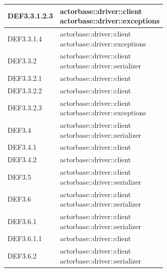\documentclass{scalatekids-article}
\begin{document}
\begin{longtable}[H]{|p{3.5cm}|p{7.5cm}|}
\hline
DEF3.3.1.2.3 & \multiLineCell[t]{actorbase::driver::client\\actorbase::driver::exceptions\\}\\
\hline
DEF3.3.1.4 & \multiLineCell[t]{actorbase::driver::client\\actorbase::driver::exceptions\\}\\
\hline
DEF3.3.2 & \multiLineCell[t]{actorbase::driver::client\\actorbase::driver::serializer\\}\\
\hline
DEF3.3.2.1 & \multiLineCell[t]{actorbase::driver::client\\}\\
\hline
DEF3.3.2.2 & \multiLineCell[t]{actorbase::driver::client\\}\\
\hline
DEF3.3.2.3 & \multiLineCell[t]{actorbase::driver::client\\actorbase::driver::exceptions\\}\\
\hline
DEF3.4 & \multiLineCell[t]{actorbase::driver::client\\actorbase::driver::serializer\\}\\
\hline
DEF3.4.1 & \multiLineCell[t]{actorbase::driver::client\\}\\
\hline
DEF3.4.2 & \multiLineCell[t]{actorbase::driver::client\\}\\
\hline
DEF3.5 & \multiLineCell[t]{actorbase::driver::client\\actorbase::driver::serializer\\}\\
\hline
DEF3.6 & \multiLineCell[t]{actorbase::driver::client\\actorbase::driver::serializer\\}\\
\hline
DEF3.6.1 & \multiLineCell[t]{actorbase::driver::client\\actorbase::driver::serializer\\}\\
\hline
DEF3.6.1.1 & \multiLineCell[t]{actorbase::driver::client\\}\\
\hline
DEF3.6.2 & \multiLineCell[t]{actorbase::driver::client\\actorbase::driver::serializer\\}\\

\end{longtable}
\end{document}
